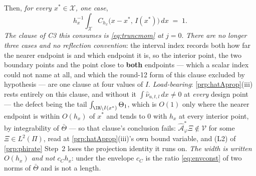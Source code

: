 \begin{lemma}
\begin{enumerate}
Then, \emph{for every $x^\ast\in\mathcal X$, one case},
\[
h_x^{-1}\!\int_{\mathcal X}C_{h_x}\big(x-x^\ast,\,I(x^\ast)\big)\,dx\;=\;1 .
\]
\emph{The clause of C3 this consumes is \eqref{eq:truncmom} at $j=0$}. \emph{There are no longer three
cases and no reflection convention}: the interval index records both how far the nearer endpoint is
and which endpoint it is, so the interior point, the two boundary points and the point close to
\textbf{both} endpoints --- which a scalar index could not name at all, and which the round-12 form of
this clause excluded by hypothesis --- are one clause at four values of $I$.
\emph{Load-bearing}:
\cref{prp:hatAprop}(iii) rests entirely on this clause, and without it $\int\hat\nu_{u,t,l}\,dx\ne0$ at
\emph{every} design point --- the defect being the tail $\int_{\IR\setminus I(x^\ast)}\Theta_1$, which is
$O(1)$ only where the nearer endpoint is within $O(h_x)$ of $x^\ast$ and tends to $0$ with $h_x$ at every
interior point, by integrability of $\bar\Theta$ --- so that clause's conclusion fails:
$\hat{\mathcal A}^\ast_\varphi\Xi\notin\mathcal V$ for some $\Xi\in L^{2}(\Pi)$, read at
\cref{prp:hatAprop}\textup{(iii)}'s own bound variable, and (L2) of \cref{prp:phirate} Step~2 loses the
projection identity it runs on.
\emph{The width is written $O(h_x)$ and not $c_Ch_x$}: under the envelope $c_C$ is the ratio
\eqref{eq:envconst} of two norms of $\bar\Theta$ and is not a length.
\end{enumerate}
\end{lemma}

